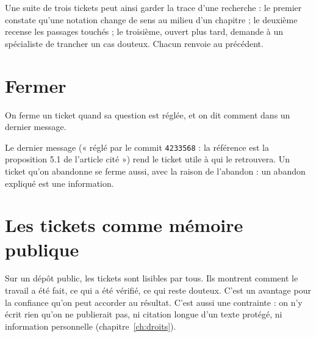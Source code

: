 \begin{exemple}
Une suite de trois tickets peut ainsi garder la trace d'une recherche : le premier constate
qu'une notation change de sens au milieu d'un chapitre ; le deuxième recense les passages
touchés ; le troisième, ouvert plus tard, demande à un spécialiste de trancher un cas
douteux. Chacun renvoie au précédent.
\end{exemple}

\section{Fermer}

\begin{regle}
On ferme un ticket quand sa question est réglée, et on dit comment dans un dernier
message.
\end{regle}

Le dernier message (« réglé par le commit \texttt{4233568} : la référence est la
proposition 5.1 de l'article cité ») rend le ticket utile à qui le retrouvera. Un ticket
qu'on abandonne se ferme aussi, avec la raison de l'abandon : un abandon expliqué est une
information.

\section{Les tickets comme mémoire publique}

Sur un dépôt public, les tickets sont lisibles par tous. Ils montrent comment le travail a
été fait, ce qui a été vérifié, ce qui reste douteux. C'est un avantage pour la confiance
qu'on peut accorder au résultat. C'est aussi une contrainte : on n'y écrit rien qu'on ne
publierait pas, ni citation longue d'un texte protégé, ni information personnelle
(chapitre~\ref{ch:droits}).
